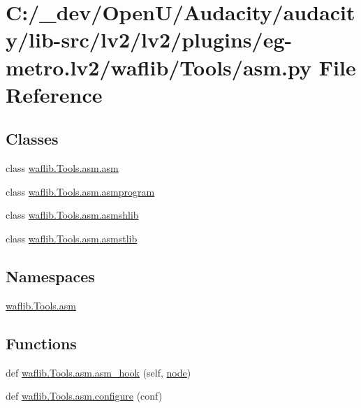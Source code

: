 \hypertarget{lv2_2plugins_2eg-metro_8lv2_2waflib_2_tools_2asm_8py}{}\section{C\+:/\+\_\+dev/\+Open\+U/\+Audacity/audacity/lib-\/src/lv2/lv2/plugins/eg-\/metro.lv2/waflib/\+Tools/asm.py File Reference}
\label{lv2_2plugins_2eg-metro_8lv2_2waflib_2_tools_2asm_8py}
\subsection*{Classes}
\begin{DoxyCompactItemize}
\item 
class \hyperlink{classwaflib_1_1_tools_1_1asm_1_1asm}{waflib.\+Tools.\+asm.\+asm}
\item 
class \hyperlink{classwaflib_1_1_tools_1_1asm_1_1asmprogram}{waflib.\+Tools.\+asm.\+asmprogram}
\item 
class \hyperlink{classwaflib_1_1_tools_1_1asm_1_1asmshlib}{waflib.\+Tools.\+asm.\+asmshlib}
\item 
class \hyperlink{classwaflib_1_1_tools_1_1asm_1_1asmstlib}{waflib.\+Tools.\+asm.\+asmstlib}
\end{DoxyCompactItemize}
\subsection*{Namespaces}
\begin{DoxyCompactItemize}
\item 
 \hyperlink{namespacewaflib_1_1_tools_1_1asm}{waflib.\+Tools.\+asm}
\end{DoxyCompactItemize}
\subsection*{Functions}
\begin{DoxyCompactItemize}
\item 
def \hyperlink{namespacewaflib_1_1_tools_1_1asm_a287387dfaa8ffc9c35127be5128a185a}{waflib.\+Tools.\+asm.\+asm\+\_\+hook} (self, \hyperlink{structnode}{node})
\item 
def \hyperlink{namespacewaflib_1_1_tools_1_1asm_a223dd8eb9aca9f00c6758ed10833701a}{waflib.\+Tools.\+asm.\+configure} (conf)
\end{DoxyCompactItemize}
